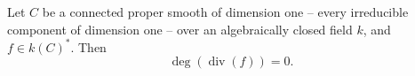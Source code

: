 \begin{lemma}
\label{lem:pcb-deg-principal-zero}
Let \(C\) be a connected proper smooth 
of dimension one -- every irreducible component of dimension one --
over an algebraically closed field \(k\), and \(f\in k(C)^*\).  Then
\[
 \deg(\operatorname{div}(f))=0.
\]
\end{lemma}
